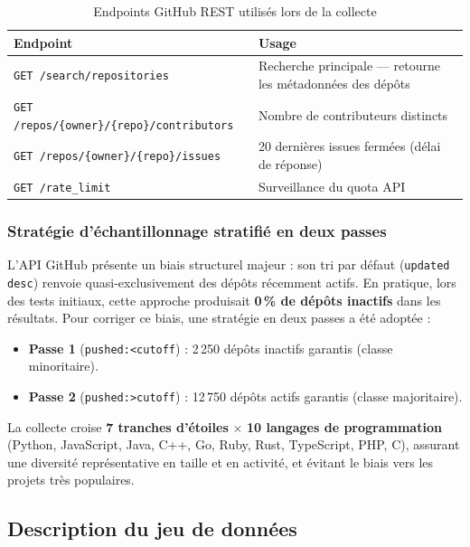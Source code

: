 \documentclass[12pt,a4paper]{article}
\begin{document}
\begin{table}[H]
  \centering
  \caption{Endpoints GitHub REST utilisés lors de la collecte}
  \label{tab:endpoints_collecte}
  \begin{tabularx}{\linewidth}{lL}
    \toprule
    \textbf{Endpoint} & \textbf{Usage} \\
    \midrule
    \texttt{GET /search/repositories} & Recherche principale --- retourne les métadonnées des dépôts \\
    \texttt{GET /repos/\{owner\}/\{repo\}/contributors} & Nombre de contributeurs distincts \\
    \texttt{GET /repos/\{owner\}/\{repo\}/issues} & 20 dernières issues fermées (délai de réponse) \\
    \texttt{GET /rate\_limit} & Surveillance du quota API \\
    \bottomrule
  \end{tabularx}
\end{table}

\subsubsection{Stratégie d'échantillonnage stratifié en deux passes}

L'API GitHub présente un biais structurel majeur : son tri par défaut (\texttt{updated desc}) renvoie
quasi-exclusivement des dépôts récemment actifs. En pratique, lors des tests initiaux, cette approche
produisait \textbf{0\,\% de dépôts inactifs} dans les résultats. Pour corriger ce biais, une stratégie
en deux passes a été adoptée :

\begin{itemize}[noitemsep]
  \item \textbf{Passe 1} (\texttt{pushed:<cutoff}) : 2\,250 dépôts inactifs garantis (classe minoritaire).
  \item \textbf{Passe 2} (\texttt{pushed:>cutoff}) : 12\,750 dépôts actifs garantis (classe majoritaire).
\end{itemize}

La collecte croise \textbf{7 tranches d'étoiles} × \textbf{10 langages de programmation} (Python,
JavaScript, Java, C++, Go, Ruby, Rust, TypeScript, PHP, C), assurant une diversité représentative en
taille et en activité, et évitant le biais vers les projets très populaires.

\subsection{Description du jeu de données}
\end{document}
